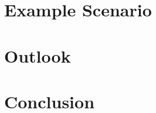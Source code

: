 \documentclass[journal]{IEEEtran}
\begin{document}
\section{Example Scenario}
\label{es}

\section{Outlook}
\label{outlook}

\section{Conclusion}
\label{sec:conclusion}

\begin{spacing}{0.3}


\end{spacing}

\end{document}
